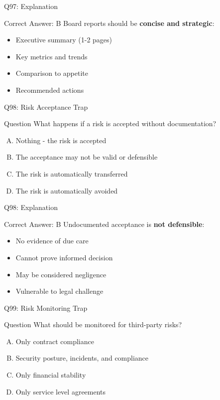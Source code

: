 \documentclass{beamer}
\begin{document}
	\begin{frame}{Q97: Explanation}
		\begin{block}{Correct Answer: B}
			Board reports should be \textbf{concise and strategic}:
			\begin{itemize}
				\item Executive summary (1-2 pages)
				\item Key metrics and trends
				\item Comparison to appetite
				\item Recommended actions
			\end{itemize}
		\end{block}
	\end{frame}
	
	\begin{frame}{Q98: Risk Acceptance Trap}
		\begin{block}{Question}
			What happens if a risk is accepted without documentation?
		\end{block}
		\begin{enumerate}[(A)]
			\item Nothing - the risk is accepted
			\item The acceptance may not be valid or defensible
			\item The risk is automatically transferred
			\item The risk is automatically avoided
		\end{enumerate}
	\end{frame}
	
	\begin{frame}{Q98: Explanation}
		\begin{block}{Correct Answer: B}
			Undocumented acceptance is \textbf{not defensible}:
			\begin{itemize}
				\item No evidence of due care
				\item Cannot prove informed decision
				\item May be considered negligence
				\item Vulnerable to legal challenge
			\end{itemize}
		\end{block}
	\end{frame}
	
	\begin{frame}{Q99: Risk Monitoring Trap}
		\begin{block}{Question}
			What should be monitored for third-party risks?
		\end{block}
		\begin{enumerate}[(A)]
			\item Only contract compliance
			\item Security posture, incidents, and compliance
			\item Only financial stability
			\item Only service level agreements
		\end{enumerate}
	\end{frame}
	
\end{document}
